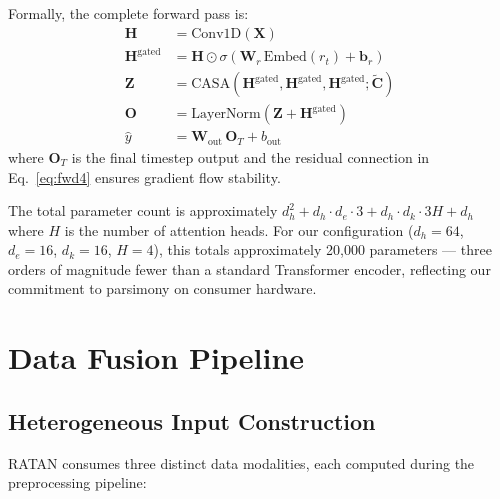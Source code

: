 \documentclass[conference]{IEEEtran}
\begin{document}
Formally, the complete forward pass is:
\begin{align}
\mathbf{H} &= \text{Conv1D}(\mathbf{X}) \label{eq:fwd1} \\
\mathbf{H}^{\text{gated}} &= \mathbf{H} \odot \sigma(\mathbf{W}_r \, \text{Embed}(r_t) + \mathbf{b}_r) \label{eq:fwd2} \\
\mathbf{Z} &= \text{CASA}(\mathbf{H}^{\text{gated}}, \mathbf{H}^{\text{gated}}, \mathbf{H}^{\text{gated}}; \tilde{\mathbf{C}}) \label{eq:fwd3} \\
\mathbf{O} &= \text{LayerNorm}(\mathbf{Z} + \mathbf{H}^{\text{gated}}) \label{eq:fwd4} \\
\hat{y} &= \mathbf{W}_{\text{out}} \, \mathbf{O}_{T} + b_{\text{out}} \label{eq:fwd5}
\end{align}
where $\mathbf{O}_T$ is the final timestep output and the residual connection in Eq.~\eqref{eq:fwd4} ensures gradient flow stability.

The total parameter count is approximately $d_h^2 + d_h \cdot d_e \cdot 3 + d_h \cdot d_k \cdot 3H + d_h$ where $H$ is the number of attention heads. For our configuration ($d_h = 64$, $d_e = 16$, $d_k = 16$, $H = 4$), this totals approximately 20,000 parameters --- three orders of magnitude fewer than a standard Transformer encoder, reflecting our commitment to parsimony on consumer hardware.

\section{Data Fusion Pipeline}
\label{sec:data}

\subsection{Heterogeneous Input Construction}

RATAN consumes three distinct data modalities, each computed during the preprocessing pipeline:
\end{document}
